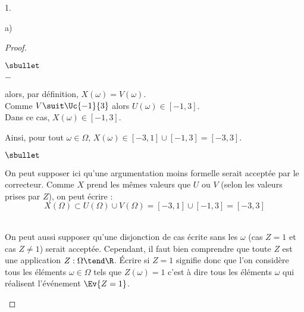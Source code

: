 \documentclass[11pt]{article}%
\begin{document}
\begin{noliste}{1.}
\begin{noliste}{a)}
\begin{proof}
\begin{noliste}{$\sbullet$}
\begin{noliste}{$-$}
        \item {} alors, par définition,
          $X(\omega) = V(\omega)$.\\
          Comme $V \suit \Uc{-1}{3}$ alors $U(\omega) \in [-1,3]$.\\[.1cm]
          Dans ce cas, $X(\omega) \in [-1,3]$.
        \end{noliste}
        Ainsi, pour tout $\omega \in \Omega$, $X(\omega) \in [-3,1]
        \cup [-1,3] = [-3,3]$.%
        ~\\[-1.2cm]
      \end{noliste}
      \begin{remark}%
        \begin{noliste}{$\sbullet$}
        \item On peut supposer ici qu'une argumentation moins formelle
          serait acceptée par le correcteur. Comme $X$ prend les mêmes
          valeurs que $U$ ou $V$ (selon les valeurs prises par $Z$),
          on peut écrire :%
          \[
          X(\Omega) \subset U(\Omega) \cup V(\Omega) = [-3, 1] \cup
          [-1, 3] = [-3, 3]
          \]~\\[-1.35cm]
          
        \item On peut aussi supposer qu'une disjonction de cas écrite
          sans les $\omega$ (cas $Z = 1$ et cas $Z \neq 1$) serait
          acceptée. Cependant, il faut bien comprendre que toute \var
          $Z$ est une application $Z : \Omega \tend \R$. Écrire \og si
          $Z = 1$ \fg{} signifie donc que l'on considère tous les
          éléments $\omega \in \Omega$ tels que $Z(\omega) = 1$ c'est
          à dire tous les éléments $\omega$ qui réalisent l'événement
          $\Ev{Z = 1}$.
          

\end{noliste}
\end{remark}
\end{proof}
\end{noliste}
\end{noliste}
\end{document}
